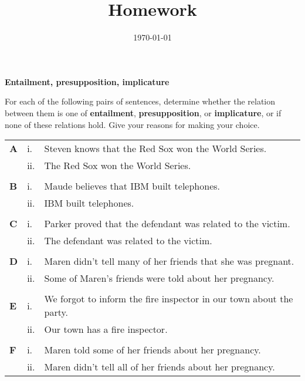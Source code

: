 \documentclass[11pt]{article}
\title{Homework \hwnumber} %
\author{\myname} %
\date{\textbf{\mycourse} \hfill {\today} \hfill \textbf{\semesteryear}} %
\begin{document}
\thispagestyle{empty} %

\clearpage %
\maketitle


\begin{problem}{1}
\textbf{Entailment, presupposition, implicature}

For each of the following pairs of sentences, determine whether the relation between them is one of \textbf{entailment}, \textbf{presupposition}, or \textbf{implicature}, or if none of these relations hold. Give your reasons for making your choice.

\begin{tabular}{l l l}
    \textbf{A} & i. & Steven knows that the Red Sox won the World Series. \\
    & ii. & The Red Sox won the World Series. \\
    & & \\
    \textbf{B} & i. & Maude believes that IBM built telephones. \\
    & ii. & IBM built telephones. \\
    & & \\
    \textbf{C} & i. & Parker proved that the defendant was related to the victim. \\
    & ii. & The defendant was related to the victim. \\
    & & \\
    \textbf{D} & i. & Maren didn't tell many of her friends that she was pregnant. \\
    & ii. & Some of Maren's friends were told about her pregnancy. \\
    & & \\
    \textbf{E} & i. & We forgot to inform the fire inspector in our town about the party. \\
    & ii. & Our town has a fire inspector. \\
    & & \\
    \textbf{F} & i. & Maren told some of her friends about her pregnancy. \\
    & ii. & Maren didn't tell all of her friends about her pregnancy. \\
\end{tabular}

\end{problem}
\end{document}
